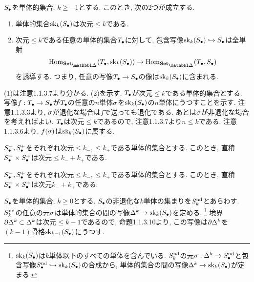 \documentclass[uplatex, a4paper, 14Q, dvipdfmx]{jsreport}
\begin{document}
\begin{prop}
  $\S$を単体的集合, $k \geq -1$とする. 
  このとき, 次の2つが成立する. 
  \begin{enumerate}
    \item 単体的集合$\sk_k(\S)$は次元$\leq k$である. 
    \item 次元$\leq k$である任意の単体的集合$\T$に対して, 包含写像$\sk_k(\S) \hookrightarrow \S$は全単射 
    \begin{align*}
      \Hom_{\sset}(\T,\sk_k(\S)) \to \Hom_{\sset}(\T,\S)
    \end{align*}
    を誘導する. 
    つまり, 任意の写像$\T \to \S$の像は$\sk_k(\S)$に含まれる.
  \end{enumerate}
\end{prop}

\begin{Proof}
  (1)は注意1.1.3.7より分かる. 
  (2)を示す. 
  $\T$が次元$\leq k$である単体的集合とする. 
  写像$f: \T \to \S$が$\T$の任意の$n$単体$\si$を$\sk_k(\S)$の$n$単体にうつすことを示す. 
  注意1.1.3.3より, $\si$が退化な場合は$f$で送っても退化である. 
  あとは$\si$が非退化な場合を考えればよい. 
  $\T$は次元$\leq k$であるので, 注意1.1.3.7より$n \leq k$である. 
  注意1.1.3.6より, $f(\si)$は$\sk_k(\S)$に属する. 
\end{Proof}

\begin{prop}
  $\S^-,\S^+$をそれぞれ次元$\leq k_-, \leq k_+$である単体的集合とする. 
  このとき, 直積$\S^- \ti \S^+$は次元$\leq k_- + k_+$である. 
\end{prop}

\begin{Proof}
  
\end{Proof}

\begin{exe}
  $\S^-,\S^+$をそれぞれ次元$\leq k_-, \leq k_+$である単体的集合とする. 
  このとき, 直積$\S^- \ti \S^+$は次元$k_- + k_+$である. 
\end{exe}

$\S$を単体的集合, $k \geq 0$とする. 
$\S$の非退化な$k$単体の集まりを$\snd$とあらわす. 
$\snd$の任意の元$\si$は単体的集合の間の写像$\Delta^k \to \sk_k(\S)$を定める. 
\footnote{
  $\sk_k(\S)$は$k$単体以下のすべての単体を含んでいる. 
  $\snd$の元$\si: \Delta^k \to S^{\mathrm{nd}}_{\bullet}$と包含写像$S^{\mathrm{nd}}_{\bullet} \hookrightarrow \sk_k(\S)$の合成から, 
  単体的集合の間の写像$\Delta^k \to \sk_k(\S)$が定まる. 
}
境界$\del \Delta^k \subset \Delta^k$は次元$\leq k-1$であるので, 命題1.1.3.10より, この写像は$\del \Delta^k$を$(k-1)$骨格$\sk_{k-1}(\S)$にうつす. 
\end{document}
